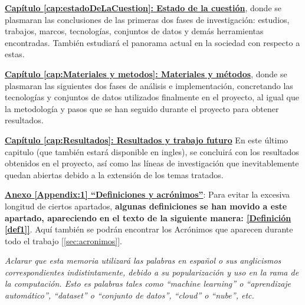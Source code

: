 \hyperref[cap:estadoDeLaCuestion]{\textbf{Capítulo \ref*{cap:estadoDeLaCuestion}: Estado de la cuestión}}, donde se plasmaran las conclusiones de las primeras dos fases de investigación: estudios, trabajos, marcos, tecnologías, conjuntos de datos y demás herramientas encontradas. También estudiará el panorama actual en la sociedad con respecto a estas.

\hyperref[cap:Materiales y metodos]{\textbf{Capítulo \ref*{cap:Materiales y metodos}: Materiales y métodos}}, donde se plasmaran las siguientes dos fases de análisis e implementación, concretando las tecnologías y conjuntos de datos utilizados finalmente en el proyecto, al igual que la metodología y pasos que se han seguido durante el proyecto para obtener resultados. 


\hyperref[cap:Resultados]{\textbf{Capítulo \ref*{cap:Resultados}: Resultados y trabajo futuro}} En este último capitulo  (que también estará disponible en ingles), se concluirá con los resultados obtenidos en el proyecto, así como las líneas de investigación que inevitablemente quedan abiertas debido a la extensión de los temas tratados.

\hyperref[Appendix:1]{\textbf{Anexo \ref*{Appendix:1} ``Definiciones y acrónimos''}}: Para evitar la excesiva longitud de ciertos apartados, \textbf{algunas definiciones se han movido a este apartado, apareciendo en el texto de la siguiente manera:  \hyperref[def1]{[Definición \ref*{def1}]}}. Aquí también se podrán encontrar los Acrónimos que aparecen durante todo el trabajo [\ref{sec:acronimos}]. 


\emph{Aclarar que esta memoria utilizará las palabras en español o sus anglicismos correspondientes indistintamente, debido a su popularización y uso en la rama de la computación. Esto es palabras tales como ``machine learning'' o ``aprendizaje automático'', ``dataset'' o ``conjunto de datos'', ``cloud'' o ``nube'', etc.}